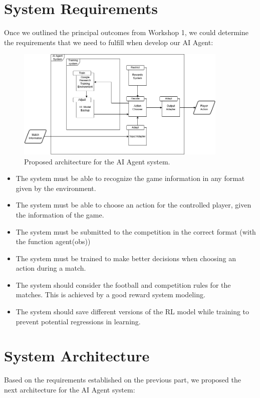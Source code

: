 \documentclass{article}
\begin{document}
\section*{System Requirements}
Once we outlined the principal outcomes from Workshop 1, we could determine the requirements that we need to fulfill when develop our AI Agent:

\begin{figure}[htbp]
    \centering
    \includegraphics[width=0.9\textwidth]{SystemDiagram.png}
    \caption{Proposed architecture for the AI Agent system.}
    \label{fig:architecture}
\end{figure}

\begin{itemize}
    \item The system must be able to recognize the game information in any format given by the environment.
    \item The system must be able to choose an action for the controlled player, given the information of the game.
    \item The system must be submitted to the competition in the correct format (with the function agent(obs))
    \item The system must be trained to make better decisions when choosing an action during a match.
    \item The system should consider the football and competition rules for the matches. This is achieved by a good reward system modeling.
    \item The system should save different versions of the RL model while training to prevent potential regressions in learning.
\end{itemize}

\section*{System Architecture}
Based on the requirements established on the previous part, we proposed the next architecture for the AI Agent system:
\end{document}

